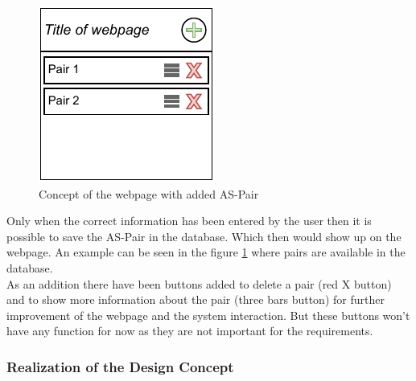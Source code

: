 \begin{figure}
    \centering
     \begin{minipage}[b]{0.5\textwidth}
         \centering
         \includegraphics[width=\textwidth]{images/4_3/concept-webpage-pairs.pdf}
         \caption{Concept of the webpage with added AS-Pair}
         \label{fig:concept-webpage-pairs}
     \end{minipage}
  
\end{figure}

Only when the correct information has been entered by the user then it is possible to save the AS-Pair in the database. Which then would show up on the webpage. An example can be seen in the figure \ref{fig:concept-webpage-pairs} where pairs are available in the database. \\

As an addition there have been buttons added to delete a pair (red X button) and to show more information about the pair (three bars button) for further improvement of the webpage and the system interaction. But these buttons won't have any function for now as they are not important for the requirements. \\

\subsubsection{Realization of the Design Concept}

